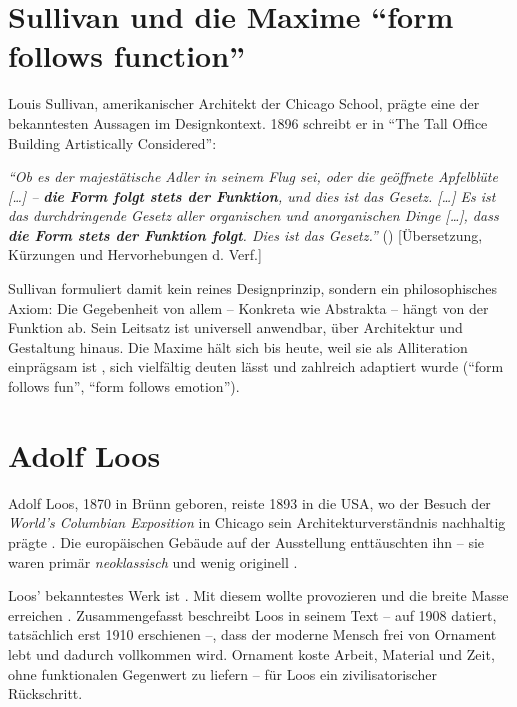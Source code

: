 \documentclass[
    a4paper,
    11pt,
    bibliography=totoc,
    listof=totoc,
    parskip=half,
    headings=normal
]{scrbook}
\begin{document}
\section{Sullivan und die Maxime \enquote{form follows function}}
Louis Sullivan, amerikanischer Architekt der Chicago School, prägte eine der bekanntesten Aussagen im Designkontext. 1896 schreibt er in \enquote{The Tall Office Building Artistically Considered}:

\textit{\enquote{Ob es der majestätische Adler in seinem Flug sei, oder die geöffnete Apfelblüte [\ldots] -- \textbf{die Form folgt stets der Funktion}, und dies ist das Gesetz. [\ldots] Es ist das durchdringende Gesetz aller organischen und anorganischen Dinge [\ldots], dass \textbf{die Form stets der Funktion folgt}. Dies ist das Gesetz.}} ()
    [Übersetzung, Kürzungen und Hervorhebungen d. Verf.]

Sullivan formuliert damit kein reines Designprinzip, sondern ein philosophisches Axiom: Die Gegebenheit von allem -- Konkreta wie Abstrakta -- hängt von der Funktion ab. Sein Leitsatz ist universell anwendbar, über Architektur und Gestaltung hinaus. Die Maxime hält sich bis heute, weil sie als Alliteration einprägsam ist \autocite{lindstrombergMnemonicEffectNoticing2008}, sich vielfältig deuten lässt und zahlreich adaptiert wurde (\enquote{form follows fun}, \enquote{form follows emotion}).

\section{Adolf Loos}
Adolf Loos, 1870 in Brünn geboren, reiste 1893 in die USA, wo der Besuch der \textit{World's Columbian Exposition} in Chicago sein Architekturverständnis nachhaltig prägte \autocite{s.r.oAdolfLoosArchitekti}. Die europäischen Gebäude auf der Ausstellung enttäuschten ihn -- sie waren primär \textit{neoklassisch} und wenig originell \autocite[15]{Loos_Samtliche_Schriften}.

Loos' bekanntestes Werk ist . Mit diesem wollte provozieren und die breite Masse erreichen \autocite[4]{mossConstructingModernVienna2010}. Zusammengefasst beschreibt Loos in seinem Text -- auf 1908 datiert, tatsächlich erst 1910 erschienen --, dass der moderne Mensch frei von Ornament lebt und dadurch vollkommen wird. Ornament koste Arbeit, Material und Zeit, ohne funktionalen Gegenwert zu liefern -- für Loos ein zivilisatorischer Rückschritt.
\end{document}
